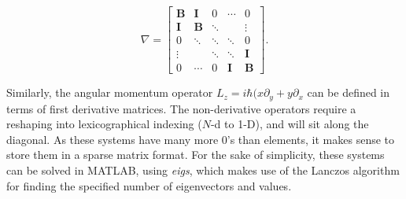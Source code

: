 \begin{equation}
    \nabla=
    \begin{bmatrix}
        \mathbf{B}    & \mathbf{I} &      0      &  \cdots      &      0       \\
        \mathbf{I}    & \mathbf{B} &  \ddots     &              &  \vdots      \\
        0             & \ddots     &  \ddots     &  \ddots      &      0       \\
        \vdots        &            &  \ddots     &  \ddots      &  \mathbf{I}  \\
        0             & \cdots     &      0      &  \mathbf{I}  &  \mathbf{B}
    \end{bmatrix}.
\end{equation}

Similarly, the angular momentum operator $L_z = i\hbar(x\partial_y + y\partial_x$ can be defined in terms of first derivative matrices. The non-derivative operators require a reshaping into lexicographical indexing ($N$-d to 1-D), and will sit along the diagonal. As these systems have many more 0's than elements, it makes sense to store them in a sparse matrix format. For the sake of simplicity, these systems can be solved in MATLAB, using \textit{eigs}, which makes use of the Lanczos algorithm for finding the specified number of eigenvectors and values.
